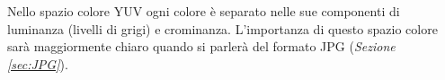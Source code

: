 \documentclass{subfiles}
\begin{document}
Nello spazio colore YUV ogni colore è separato nelle sue componenti di luminanza (livelli di grigi) e crominanza.
L'importanza di questo spazio colore sarà maggiormente chiaro quando si parlerà del formato JPG (\emph{Sezione \ref{sec:JPG}}).
\end{document}
